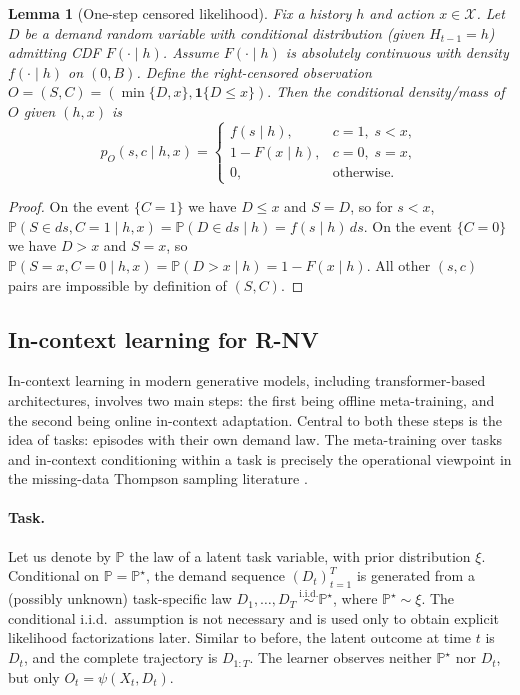 \documentclass[11pt]{article}
\newtheorem{lemma}{Lemma}
\renewcommand{\P}{\mathbb{P}}
\providecommand{\cX}{\mathcal{X}}
\begin{document}
\begin{lemma}[One-step censored likelihood]
\label{lem:censored-likelihood}
Fix a history $h$ and action $x\in\cX$.
Let $D$ be a demand random variable with conditional distribution (given $H_{t-1}=h$) admitting CDF $F(\cdot\mid h)$.
Assume $F(\cdot\mid h)$ is absolutely continuous with density $f(\cdot\mid h)$ on $(0,B)$.
Define the right-censored observation
\(
O=(S,C)=(\min\{D,x\},\mathbf{1}\{D\le x\}).
\)
Then the conditional density/mass of $O$ given $(h,x)$ is
\[
p_O(s,c\mid h,x)
=
\begin{cases}
f(s\mid h), & c=1,\; s<x,\\[2pt]
1-F(x\mid h), & c=0,\; s=x,\\[2pt]
0, & \text{otherwise.}
\end{cases}
\]
\end{lemma}

\begin{proof}
On the event $\{C=1\}$ we have $D\le x$ and $S=D$, so for $s<x$,
\(
\P(S\in ds,C=1\mid h,x)=\P(D\in ds\mid h)=f(s\mid h)\,ds.
\)
On the event $\{C=0\}$ we have $D>x$ and $S=x$, so
\(
\P(S=x,C=0\mid h,x)=\P(D>x\mid h)=1-F(x\mid h).
\)
All other $(s,c)$ pairs are impossible by definition of $(S,C)$.
\end{proof}







\subsection{In-context learning for R-NV}

In-context learning in modern generative models, including transformer-based architectures, involves two main steps: the first being offline meta-training, and the second being online in-context adaptation. Central to both these steps is the idea of tasks: episodes with their own demand law. The meta-training over tasks and in-context conditioning within a task is precisely the operational viewpoint in the missing-data Thompson sampling literature \citep{cai2024active, zhang2025contextual}.


\paragraph{Task.}
Let us denote by $\P$ the law of a latent task variable, with prior distribution $\xi$.
Conditional on $\P=\P^\star$, the demand sequence $(D_t)_{t=1}^T$ is generated from a (possibly unknown)
task-specific law $D_1,\dots,D_T \ \overset{\mathrm{i.i.d.}}{\sim} \P^\star$, where $\P^\star \sim \xi$. The conditional i.i.d.\ assumption is not necessary and is used only to obtain explicit likelihood factorizations later. Similar to before, the latent outcome at time $t$ is $D_t$, and the complete trajectory is $D_{1:T}$. The learner observes neither $\P^\star$ nor $D_t$, but only $O_t=\psi(X_t,D_t)$.
\end{document}
